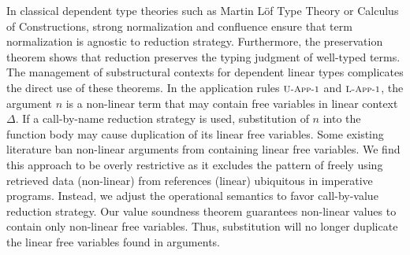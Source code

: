 \documentclass{article}
\newcommand{\rname}[1]{\textsc{\footnotesize #1}}
\begin{document}
  In classical dependent type theories such as Martin L\"{o}f Type Theory or Calculus of Constructions, strong normalization and confluence ensure that term normalization is agnostic to reduction strategy. Furthermore, the preservation theorem shows that reduction preserves the typing judgment of well-typed terms. The management of substructural contexts for dependent linear types complicates the direct use of these theorems. In the application rules $\rname{U-App-1}$ and $\rname{L-App-1}$, the argument $n$ is a non-linear term that may contain free variables in linear context $\Delta$. If a call-by-name reduction strategy is used, substitution of $n$ into the function body may cause duplication of its linear free variables. Some existing literature ban non-linear arguments from containing linear free variables. We find this approach to be overly restrictive as it excludes the pattern of freely using retrieved data (non-linear) from references (linear) ubiquitous in imperative programs. Instead, we adjust the operational semantics to favor call-by-value reduction strategy. Our value soundness theorem guarantees non-linear values to contain only non-linear free variables. Thus, substitution will no longer duplicate the linear free variables found in arguments.
\end{document}
